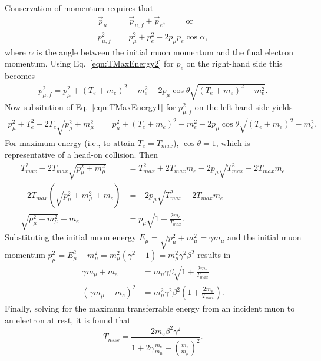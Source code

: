 Conservation of momentum requires that
\begin{align*}
\vec{p}_\mu&=\vec{p}_{\mu,f}+\vec{p}_e, \qquad\text{ or}\\
 p_{\mu,f}^2&=p_\mu ^2 + p_e^2-2p_\mu p_e \cos\alpha,
\end{align*}
where $\alpha$ is the angle between the initial muon momentum and the final electron momentum.
Using Eq.~\eqref{eqn:TMaxEnergy2} for $p_e$ on the right-hand side this becomes
\begin{align*}
p_{\mu,f}^2=p_\mu ^2+(T_e+m_e)^2-m_e ^2-2p_\mu\cos\theta \sqrt{(T_e+m_e)^2-m_e^2}.
\end{align*}
Now subsitution of Eq.~\eqref{eqn:TMaxEnergy1} for $p_{\mu,f} ^2$ on the left-hand side yields
\begin{align*}
p_\mu ^2+T_e ^2 - 2T_e \sqrt{p_\mu^2+m_\mu ^2}&=p_\mu ^2+(T_e+m_e)^2-m_e ^2 -2p_\mu\cos\theta\sqrt{(T_e+m_e)^2-m_e^2}.
\end{align*}
For maximum energy (i.e., to attain $T_e=T_{max}$), $\cos\theta=1$, which is representative of a head-on collision. Then
\begin{align*}
T_{max} ^2-2T_{max}\sqrt{p_\mu ^2+m_\mu ^2} &=T_{max}^2+2T_{max}m_e-2p_\mu\sqrt{T_{max}^2+2T_{max}m_e}\\
-2T_{max}(\sqrt{p_\mu ^2 + m_\mu ^2}+m_e)&=-2p_\mu\sqrt{T_{max}^2+2T_{max}m_e}\\
\sqrt{p_\mu ^2+m_\mu ^2}+m_e&=p_\mu\sqrt{1+\frac{2m_e}{T_{max}}}.
\end{align*}
Substituting the initial muon energy $E_\mu=\sqrt{p_\mu ^2+m_\mu ^2}=\gamma m_\mu$ and the initial muon momentum $p_\mu ^2=E_\mu ^2 - m_\mu ^2 = m_\mu ^2 (\gamma^2-1)=m_\mu ^2 \gamma^2 \beta^2$ results in
\begin{align*}
\gamma m_\mu + m_e &= m_\mu\gamma\beta\sqrt{1+\frac{2m_e}{T_{max}}}\\
(\gamma m_\mu +m_e)^2 &=m_\mu^2\gamma^2\beta^2 \left(1+\frac{2m_e}{T_{max}}\right).
\end{align*}
Finally, solving for the maximum transferrable energy from an incident muon to an electron at rest, it is found that
\begin{equation}\label{eqn:tmax}
T_{max}=\frac{2m_e \beta^2 \gamma^2}{1+2\gamma\frac{m_e}{m_\mu}+(\frac{m_e}{m_\mu})^2}.
\end{equation}

